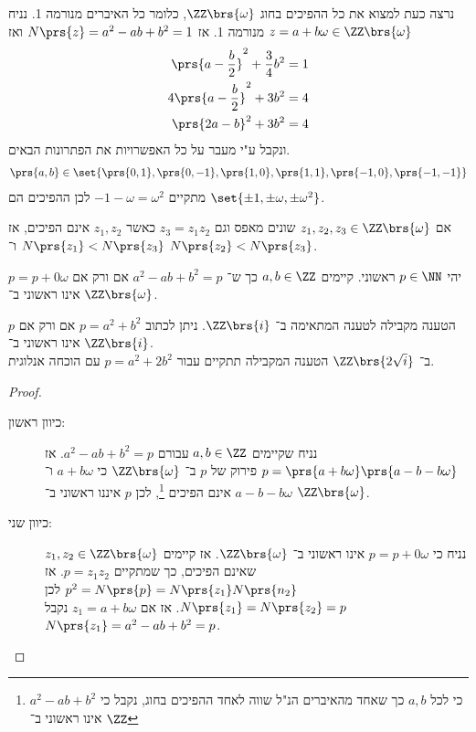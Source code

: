 \documentclass[a4paper,10pt,twoside,openany]{book}
\begin{document}
נרצה כעת למצוא את כל ההפיכים בחוג
$\ZZ\brs{\omega}$,
כלומר כל האיברים מנורמה 1.
נניח
$z = a+b\omega \in \ZZ\brs{\omega}$
מנורמה 1. אז
$N\prs{z} = a^2 - ab + b^2 = 1$
ואז
\begin{align*}
\prs{a-\frac{b}{2}}^2 + \frac{3}{4}b^2 &= 1 \\
4\prs{a-\frac{b}{2}}^2 + 3b^2 &= 4 \\
\prs{2a-b}^2 + 3b^2 &= 4
\end{align*}
ונקבל ע"י מעבר על כל האפשרויות את הפתרונות הבאים.
\begin{align*}
\prs{a,b} \in \set{\prs{0,1},\prs{0,-1}, \prs{1,0}, \prs{1,1}, \prs{-1,0}, \prs{-1,-1}}
\end{align*}
מתקיים
$-1-\omega = \omega^2$
לכן ההפיכים הם
$\set{\pm 1, \pm \omega, \pm \omega^2}$.

\begin{corollary}
אם
$z_1, z_2, z_3 \in \ZZ\brs{\omega}$
שונים מאפס וגם
$z_3 = z_1 z_2$
כאשר
$z_1, z_2$
אינם הפיכים, אז
$N\prs{z_1} < N\prs{z_3}$
ו־%
$N\prs{z_2} < N\prs{z_3}$.
\end{corollary}
\begin{proposition}
יהי
$p \in \NN$
ראשוני. קיימים
$a,b \in \ZZ$
כך ש־%
$a^2 - ab + b^2 = p$
אם ורק אם
$p = p+0\omega$
אינו ראשוני ב־%
$\ZZ\brs{\omega}$.
\end{proposition}
\begin{remark}
הטענה מקבילה לטענה המתאימה ב־%
$\ZZ\brs{i}$.
ניתן לכתוב
$p = a^2 + b^2$
אם ורק אם
$p$
אינו ראשוני ב־%
$\ZZ\brs{i}$.\\
ב־%
$\ZZ\brs{2\sqrt{i}}$
הטענה המקבילה תתקיים עבור
$p = a^2 + 2b^2$
עם הוכחה אנלוגית.
\end{remark}
\begin{proof}
\begin{description}
\item[כיוון ראשון:]
נניח שקיימים
$a,b \in \ZZ$
עבורם
$a^2 - ab + b^2 = p$.
אז
$p=\prs{a+b\omega}\prs{a-b-b\omega}$
פירוק של
$p$
ב־%
$\ZZ\brs{\omega}$
כי
$a+b\omega$
ו־%
$a-b-b\omega$
אינם הפיכים%
\footnote{כי לכל
$a,b$
כך שאחד מהאיברים הנ"ל שווה לאחד ההפיכים בחוג, נקבל כי
$a^2 - ab + b^2$
אינו ראשוני ב־%
$\ZZ$},
לכן
$p$
איננו ראשוני ב־%
$\ZZ\brs{\omega}$.
\item[כיוון שני:]
נניח כי
$p = p+0\omega$
אינו ראשוני ב־%
$\ZZ\brs{\omega}$.
אז קיימים
$z_1, z_2 \in \ZZ\brs{\omega}$
שאינם הפיכים, כך שמתקיים
$p = z_1 z_2$.
אז
$p^2 = N\prs{p} = N\prs{z_1} N\prs{n_2}$
לכן
$N\prs{z_1} = N\prs{z_2} = p$.
אז אם
$z_1 = a+b\omega$
נקבל
$N\prs{z_1} = a^2 - ab + b^2 = p$.
\end{description}
\end{proof}
\end{document}
